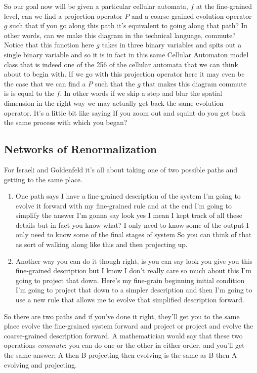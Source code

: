 \documentclass[]{article}
\begin{document}
So our goal now will be given a particular
cellular automata, $f$ at the fine-grained level,
can we find a projection operator $P$
and a coarse-grained evolution operator $g$
such that if you go along this path
it's equivalent to going along that path?
In other words, can we make this diagram
in the technical language, commute?
Notice that  this function here $g$ takes in three binary variables and spits out a single binary variable and so it is in fact
in this same Cellular Automaton model class
that is indeed one of the 256
of the cellular automata
that we can think about to begin with.
If we go with this projection
operator here
it may even be the case
that we can find a $P$ such that
the $g$ that makes this diagram commute is
is equal to the $f$. In other words
if we skip a step and blur
the spatial dimension in the right way
we may actually get back
the same evolution operator.
It's a little bit like saying
If you zoom out
and squint do you get back
the same process with which you began?

\subsection{Networks of Renormalization}

For Israeli and Goldenfeld it's all about taking one of two possible paths and getting to the same place.
\begin{enumerate}
	\item One path says I have a fine-grained description of the system
	I'm going to evolve it forward with my fine-grained rule and at the end I'm going to simplify the answer I'm gonna say look yes I mean I kept track of all these details but in fact you know what? I only need to know some of the output
	I only need to know some of the final stages of system 	So you can think of that as sort of walking along like this and then projecting up.
	\item Another way you can do it though 	right, is you can say look you give you this fine-grained description 	but I know I don't really care so much about this I'm going to project that down. 	Here's my fine-grain beginning initial condition 	I'm going to project that down to a simpler description and then I'm going to use a new rule that allows me to evolve
	that simplified description forward.
\end{enumerate}

So there are two paths and if you've done it right, they'll get you to the same place evolve the fine-grained system forward and project or project and evolve the coarse-grained description forward. A mathematician would say that these two operations \emph{commute}: you can do one or the other in either order,
and you'll get the same answer; A then B projecting then evolving is the same as B then A evolving and projecting.
\end{document}
